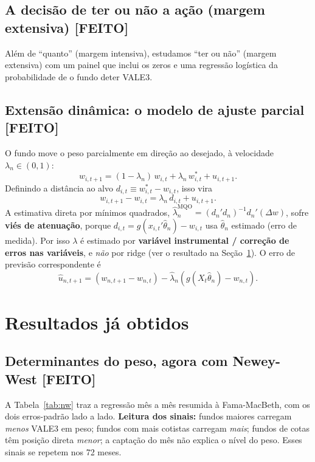\documentclass[11pt,a4paper]{article}
\newcommand{\feito}{\textcolor{feitog}{\textbf{[FEITO]}}}
\begin{document}
\subsection{A decisão de ter ou não a ação (margem extensiva) \feito}
Além de ``quanto'' (margem intensiva), estudamos ``ter ou não'' (margem extensiva) com um painel
que inclui os zeros e uma regressão logística da probabilidade de o fundo deter VALE3.

\subsection{Extensão dinâmica: o modelo de ajuste parcial \feito}
\label{sec:pa}
O fundo move o peso parcialmente em direção ao desejado, à velocidade $\lambda_n\in(0,1)$:
\begin{equation}
w_{i,t+1} = (1-\lambda_n)\,w_{i,t} + \lambda_n\,w^{*}_{i,t} + u_{i,t+1}.
\label{eq:pa1}
\end{equation}
Definindo a distância ao alvo $d_{i,t}\equiv w^{*}_{i,t}-w_{i,t}$, isso vira
\begin{equation}
w_{i,t+1}-w_{i,t} = \lambda_n\,d_{i,t} + u_{i,t+1}.
\label{eq:pa2}
\end{equation}
A estimativa direta por mínimos quadrados, $\widehat{\lambda}^{\text{MQO}}_n=(d_n'd_n)^{-1}d_n'(\Delta w)$,
sofre \textbf{viés de atenuação}, porque $d_{i,t}=g(x_{i,t}'\widehat{\theta}_n)-w_{i,t}$ usa
$\widehat{\theta}_n$ estimado (erro de medida). Por isso $\lambda$ é estimado por
\textbf{variável instrumental / correção de erros nas variáveis}, e \emph{não} por ridge (ver o
resultado na Seção~\ref{sec:res1}). O erro de previsão correspondente é
\begin{equation}
\widehat{u}_{n,t+1} = (w_{n,t+1}-w_{n,t}) - \widehat{\lambda}_n\!\left(g(X_t\widehat{\theta}_n)-w_{n,t}\right).
\label{eq:u}
\end{equation}

\section{Resultados já obtidos}
\label{sec:res1}

\subsection{Determinantes do peso, agora com Newey-West \feito}
A Tabela~\ref{tab:nw} traz a regressão mês a mês resumida à Fama-MacBeth, com os dois
erros-padrão lado a lado. \textbf{Leitura dos sinais:} fundos maiores carregam \emph{menos} VALE3
em peso; fundos com mais cotistas carregam \emph{mais}; fundos de cotas têm posição direta
\emph{menor}; a captação do mês não explica o nível do peso. Esses sinais se repetem nos 72 meses.
\end{document}
